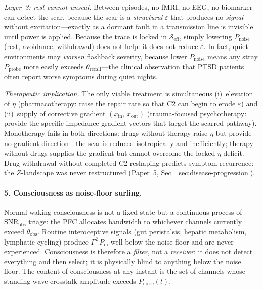 \documentclass[aps,pre,twocolumn,superscriptaddress,floatfix]{revtex4-2}
\begin{document}
\emph{Layer~3: rest cannot unseal.}
Between episodes, no fMRI, no EEG, no biomarker
can detect the scar, because the scar is
a \emph{structural} $\varepsilon$ that produces no
\emph{signal} without excitation---exactly as a
dormant fault in a transmission line is invisible
until power is applied.
Because the trace is locked in
$\mathcal{S}_{\text{eff}}$, simply lowering
$P_{\text{noise}}$ (rest, avoidance, withdrawal)
does not help: it does not reduce $\varepsilon$.
In fact, quiet environments may \emph{worsen}
flashback severity, because lower
$P_{\text{noise}}$ means any stray
$P_{\text{probe}}$ more easily exceeds
$\theta_{\text{recall}}$---the clinical observation
that PTSD patients often report worse symptoms
during quiet nights.

\emph{Therapeutic implication.}
The only viable treatment is simultaneous
(i)~elevation of $\eta$ (pharmacotherapy:
raise the repair rate so that C2 can begin to
erode $\varepsilon$) and
(ii)~supply of corrective gradient
$(x_{\text{in}},\,x_{\text{out}})$
(trauma-focused psychotherapy: provide the
specific impedance-gradient vectors that
target the scarred pathway).
Monotherapy fails in both directions: drugs
without therapy raise $\eta$ but provide no
gradient direction---the scar is reduced
isotropically and inefficiently; therapy without
drugs supplies the gradient but cannot overcome
the locked $\eta$-deficit.
Drug withdrawal without completed C2 reshaping
predicts symptom recurrence: the $Z$-landscape
was never restructured
(Paper~5, Sec.~\ref{sec:disease-progression}).

\paragraph{5. Consciousness as noise-floor surfing.}
Normal waking consciousness is not a fixed state
but a continuous process of
$\mathrm{SNR}_{\text{obs}}$ triage: the PFC
allocates bandwidth to whichever channels currently
exceed $\theta_{\text{obs}}$.
Routine interoceptive signals (gut peristalsis,
hepatic metabolism, lymphatic cycling) produce
$\Gamma^2\,P_{\text{in}}$ well below the noise
floor and are never experienced.
Consciousness is therefore a \emph{filter}, not a
\emph{receiver}: it does not detect everything
and then select; it is physically blind to
anything below the noise floor.
The content of consciousness at any instant is
the set of channels whose standing-wave
crosstalk amplitude exceeds $P_{\text{noise}}(t)$.
\end{document}
